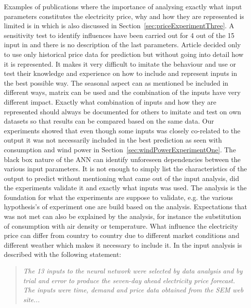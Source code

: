 Examples of publications where the importance of analysing exactly what input parameters constitutes the electricity price, why and how they are represented is limited is in\cite{szkuta1999electricity,sansom1999neural,1} which is also discussed in Section~\ref{sec:priceExperimentThree}. A sensitivity test to identify influences have been carried out for 4 out of the 15 input in \cite{szkuta1999electricity} and there is no description of the last parameters. Article \cite{1} decided only to use only historical price data for prediction but without going into detail how it is represented. It makes it very difficult to imitate the behaviour and use or test their knowledge and experience on how to include and represent inputs in the best possible way. The seasonal aspect can as mentioned be included in different ways, matrix can be used and the combination of the inputs have very different impact. Exactly what combination of inputs and how they are represented should always be documented for others to imitate and test on own datasets so that results can be compared based on the same data. Our experiments showed that even though some inputs was closely co-related to the output it was not necessarily included in the best prediction as seen with consumption and wind power in Section~\ref{sec:windPowerExperimentOne}. The black box nature of the ANN can identify unforeseen dependencies between the various input parameters. It is not enough to simply list the characteristics of the output to predict without mentioning what came out of the input analysis, did the experiments validate it and exactly what inputs was used. The analysis is the foundation for what the experiments are suppose to validate, e.g. the various hypothesis's of experiment one are build based on the analysis. Expectations that was not met can also be explained by the analysis, for instance the substitution of consumption with air density or temperature. What influence the electricity price can differ from country to country due to different market conditions and different weather which makes it necessary to include it. In \cite{sansom1999neural} the input analysis is described with the following statement:

\begin{quotation}
\textit{The 13 inputs to the neural network were selected by data analysis and by trial and error to produce the seven-day ahead electricity price forecast. The inputs were time, demand and price data obtained from the SEM web site...}
\end{quotation}

